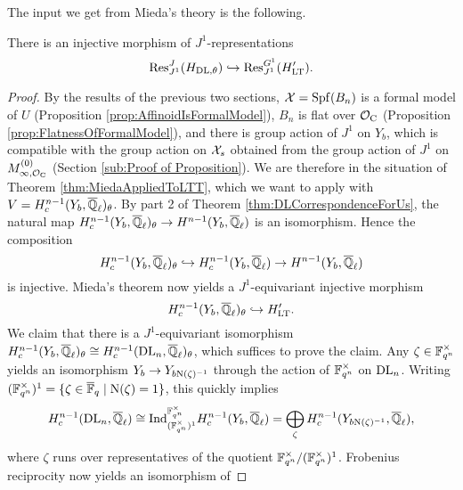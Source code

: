 \documentclass[../main.tex]{subfiles}
\begin{document}
The input we get from Mieda's theory is the following.
\begin{prop}\label{prop:J1EquivInjMor}
  There is an injective morphism of $J^1$-representations
  \begin{equation*} 
    \mathrm{Res}_{J^1}^J( H_{\mathrm{DL},\theta} ) \hookrightarrow \mathrm{Res}_{J^1}^{G^1}( H'_{\mathrm{LT}}).
  \end{equation*}
  \begin{proof}
    By the results of the previous two sections, $\mathcal{X} = \operatorname{Spf}(B_n)$ is a formal
    model of $U$ (Proposition \ref{prop:AffinoidIsFormalModel}), 
    $B_n$ is flat over $\mathcal{O}_{\mathrm{C}}$ (Proposition \ref{prop:FlatnessOfFormalModel}),
    and there is group action of $J^1$ on $Y_b$, which is compatible with the group
    action on $\mathcal{X}_s$ obtained from the group action of $J^1$ on $M_{\infty,
    \mathcal{O}_{\mathrm{C}}}^{(0)}$ (Section \ref{sub:Proof of Proposition}).
    We are therefore in the situation of Theorem \ref{thm:MiedaAppliedToLTT}, 
    which we want to apply with $V = H^{n-1}_c(Y_b, {\overline {\mathbb{Q}}_\ell})_\theta$. 
    By part 2 of Theorem \ref{thm:DLCorrespondenceForUs}, 
    the natural map $H_c^{n-1}(Y_b, {\overline {\mathbb{Q}}_\ell})_\theta \to H^{n-1}(Y_b,
    {\overline {\mathbb{Q}}_\ell})$ is an isomorphism. Hence the composition
    \begin{equation*}
      H^{n-1}_c(Y_b, {\overline {\mathbb{Q}}_\ell})_\theta \hookrightarrow H^{n-1}_c(Y_b, {\overline {\mathbb{Q}}_\ell})
      \to H^{n-1}(Y_b, {\overline {\mathbb{Q}}_\ell})
    \end{equation*}
    is injective. 
    Mieda's theorem now yields a $J^1$-equivariant injective morphism
    \begin{equation*}
      H_c^{n-1}(Y_b, {\overline {\mathbb{Q}}_\ell})_\theta \hookrightarrow H'_{\mathrm{LT}}.
    \end{equation*}
    We claim that there is a $J^1$-equivariant isomorphism $H_c^{n-1}(Y_b,
    {\overline {\mathbb{Q}}_\ell})_\theta \cong H_c^{n-1}(\mathrm{DL}_n, {\overline {\mathbb{Q}}_\ell})_\theta$,
    which suffices to prove the claim. Any $\zeta \in \mathbb{F}_{q^n}^{\times}$
    yields an isomorphism $Y_b \to Y_{b \mathrm{N}(\zeta)^{-1}}$ 
    through the action of $\mathbb{F}_{q^n}^\times$ on $\mathrm{DL}_n$. Writing
    $(\mathbb{F}_{q^n}^\times)^1 = \{\zeta \in {\overline{\mathbb{F}}_q} \mid \mathrm{N}(\zeta) = 1\}$, 
    this quickly implies
    \begin{equation*}
      H_c^{n-1}(\mathrm{DL}_n, {\overline {\mathbb{Q}}_\ell}) \cong
      \mathrm{Ind}_{(\mathbb{F}_{q^n}^\times)^1}^{\mathbb{F}_{q^n}^\times}H_c^{n-1}(Y_b, {\overline {\mathbb{Q}}_\ell})
      = \bigoplus_{\zeta} H_c^{n-1}(Y_{b \mathrm{N}(\zeta)^{-1}}, {\overline {\mathbb{Q}}_\ell}),
    \end{equation*}
    where $\zeta$ runs over representatives of the quotient
    $\mathbb{F}_{q^n}^\times/(\mathbb{F}_{q^n}^\times)^1$.
    Frobenius reciprocity now yields an isomorphism of

\end{proof}
\end{prop}
\end{document}
